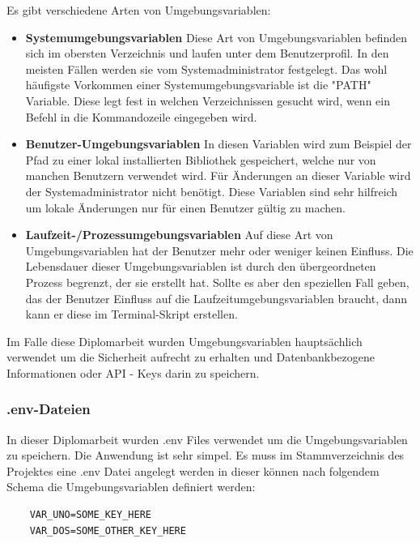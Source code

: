 Es gibt verschiedene Arten von Umgebungsvariablen:

\begin{itemize}
    \item \textbf{Systemumgebungsvariablen}
        \newline
        Diese Art von Umgebungsvariablen befinden sich im obersten Verzeichnis und laufen unter dem Benutzerprofil. In den meisten Fällen werden sie vom Systemadministrator festgelegt. Das wohl häufigste Vorkommen einer Systemumgebungsvariable ist die "PATH" Variable. Diese legt fest in welchen Verzeichnissen gesucht wird, wenn ein Befehl in die Kommandozeile eingegeben wird.
        \cite{path_setzen}
        
    \item \textbf{Benutzer-Umgebungsvariablen}
        \newline
        In diesen Variablen wird zum Beispiel der Pfad zu einer lokal installierten Bibliothek gespeichert, welche nur von manchen Benutzern verwendet wird. Für Änderungen an dieser Variable wird der Systemadministrator nicht benötigt. Diese Variablen sind sehr hilfreich um lokale Änderungen nur für einen Benutzer gültig zu machen.
    \item \textbf{Laufzeit-/Prozessumgebungsvariablen}
        \newline
        Auf diese Art von Umgebungsvariablen hat der Benutzer mehr oder weniger keinen Einfluss. Die Lebensdauer dieser Umgebungsvariablen ist durch den übergeordneten Prozess begrenzt, der sie erstellt hat.
        Sollte es aber den speziellen Fall geben, das der Benutzer Einfluss auf die Laufzeitumgebungsvariablen braucht, dann kann er diese im Terminal-Skript erstellen.
\end{itemize}

Im Falle diese Diplomarbeit wurden Umgebungsvariablen hauptsächlich verwendet um die Sicherheit aufrecht zu erhalten und Datenbankbezogene Informationen oder API - Keys darin zu speichern.

\subsubsection{.env-Dateien}
In dieser Diplomarbeit wurden .env Files verwendet um die Umgebungsvariablen zu speichern. Die Anwendung ist sehr simpel. Es muss im Stammverzeichnis des Projektes eine .env Datei angelegt werden in dieser können nach folgendem Schema die Umgebungsvariablen definiert werden:
\begin{verbatim}
    VAR_UNO=SOME_KEY_HERE
    VAR_DOS=SOME_OTHER_KEY_HERE
\end{verbatim}

